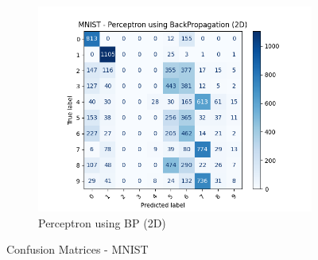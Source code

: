 \begin{figure}[htbp]
                \begin{subfigure}[b]{0.33\linewidth}
                    \centering
                    \includegraphics[width=1\linewidth]{../source/mnist/pictures/perceptronBP-confusion-2d.png}
                    \caption{Perceptron using BP (2D)}
                    \label{fig:mnist-confusion-pbp-2}
                \end{subfigure}
        \caption{Confusion Matrices - MNIST}
        \label{fig:mnist-confusion}
\end{figure}
 
